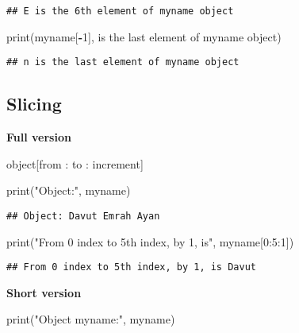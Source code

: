 \documentclass[
]{book}
\newenvironment{Shaded}{\begin{snugshade}}{\end{snugshade}}
\newcommand{\BuiltInTok}[1]{#1}
\newcommand{\DecValTok}[1]{\textcolor[rgb]{0.00,0.00,0.81}{#1}}
\newcommand{\NormalTok}[1]{#1}
\newcommand{\OperatorTok}[1]{\textcolor[rgb]{0.81,0.36,0.00}{\textbf{#1}}}
\newcommand{\StringTok}[1]{\textcolor[rgb]{0.31,0.60,0.02}{#1}}
\begin{document}
\begin{verbatim}
## E is the 6th element of myname object
\end{verbatim}

\begin{Shaded}
\begin{Highlighting}[]
\BuiltInTok{print}\NormalTok{(myname[}\OperatorTok{{-}}\DecValTok{1}\NormalTok{], }\StringTok{\textquotesingle{}is the last element of myname object\textquotesingle{}}\NormalTok{)}
\end{Highlighting}
\end{Shaded}

\begin{verbatim}
## n is the last element of myname object
\end{verbatim}

\hypertarget{slicing}{%
\subsection{Slicing}\label{slicing}}

\textbf{Full version}

object{[}from : to : increment{]}

\begin{Shaded}
\begin{Highlighting}[]
\BuiltInTok{print}\NormalTok{(}\StringTok{"Object:"}\NormalTok{, myname)}
\end{Highlighting}
\end{Shaded}

\begin{verbatim}
## Object: Davut Emrah Ayan
\end{verbatim}

\begin{Shaded}
\begin{Highlighting}[]
\BuiltInTok{print}\NormalTok{(}\StringTok{"From 0 index to 5th index, by 1, is"}\NormalTok{, myname[}\DecValTok{0}\NormalTok{:}\DecValTok{5}\NormalTok{:}\DecValTok{1}\NormalTok{])}
\end{Highlighting}
\end{Shaded}

\begin{verbatim}
## From 0 index to 5th index, by 1, is Davut
\end{verbatim}

\textbf{Short version}

\begin{Shaded}
\begin{Highlighting}[]
\BuiltInTok{print}\NormalTok{(}\StringTok{"Object myname:"}\NormalTok{, myname)}
\end{Highlighting}
\end{Shaded}
\end{document}
